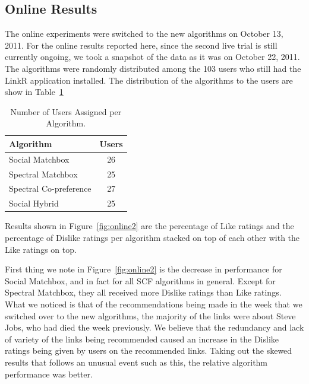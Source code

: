 \subsection{Online Results}
\label{sec:online2}

The online experiments were switched to the new algorithms on October 13, 2011. For the online results reported here, since the second live trial is still currently ongoing, we took a snapshot of the data as it was on October 22, 2011. The algorithms were randomly distributed among the 103 users who still had the LinkR application installed. The distribution of the algorithms to the users are show in Table~\ref{tab:assigned2}


\begin{table}[t!]
\centering
\begin{tabular}{| l | c |}
\hline
{\bf Algorithm} & {\bf Users} \\
\hline
Social Matchbox & 26\\
Spectral Matchbox  & 25 \\
Spectral Co-preference & 27 \\
Social Hybrid & 25 \\
\hline
\end{tabular}
\caption{Number of Users Assigned per Algorithm.}
\label{tab:assigned2}
\end{table}

Results shown in Figure~\ref{fig:online2} are the percentage of Like ratings and the percentage of Dislike ratings per algorithm stacked on top of each other with the Like ratings on top. 

First thing we note in Figure~\ref{fig:online2} is the decrease in performance for Social Matchbox, and in fact for all SCF algorithms in general. Except for Spectral Matchbox, they all received more Dislike ratings than Like ratings. What we noticed is that  of the recommendations being made in the week that we switched over to the new algorithms, the majority of the links were about Steve Jobs, who had died the week previously. We believe that the redundancy and lack of variety of the links being recommended caused an increase in the Dislike ratings being given by users on the recommended links. Taking out the skewed results that follows an unusual event such as this, the relative algorithm performance was better. 


